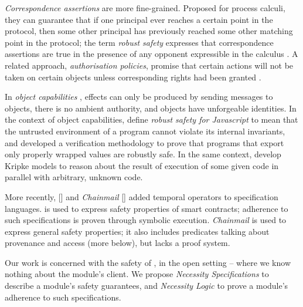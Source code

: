 \emph{Correspondence assertions} are more fine-grained. Proposed for 
process calculi, they can guarantee  that if one principal ever reaches a certain point in the protocol, then some other principal has previously reached some other matching point in the protocol; 
the term \emph{robust safety}  expresses that correspondence assertions are true in the presence of any opponent expressible in the calculus \cite{correspondence}. 
A related approach,  \emph{authorisation policies}, 
promise that certain actions will not be taken on certain objects
unless corresponding  rights had been granted  \cite{Maffeis:aiamb:thesis00}.

In   \emph{object capabilities} \cite{MillerPhD},
effects can only be produced by sending messages to objects,  there
is no ambient authority, and  objects 
have unforgeable identities.
In the context of object capabilities, \citeauthor{ddd} define  \emph{robust safety for Javascript}  
to mean that the untrusted environment of a program cannot violate 
its internal invariants, and developed  a verification methodology   to 
prove   that programs that  export only properly wrapped values  are robustly safe.
In the same context, \citeauthor{dd} develop Kripke models to reason about 
the result of execution of some given code in parallel
with arbitrary, unknown code.  
 
 More recently,  {} [\citeauthor{VerX}] and   \emph{Chainmail}  [\citeauthor{FASE}]
 added temporal operators to specification languages.
 {} is used to express safety properties of smart contracts;
 adherence to such specifications is proven through symbolic 
 execution.  \emph{Chainmail} is used to express general safety properties; it
 also includes predicates talking about provenance
 and access (more below), but lacks a proof system.
 
\vspace{.03in}
Our work is concerned with the safety of ,
in the open setting -- where we know nothing about the
module's client.
We propose \emph{Necessity Specifications} to describe a module's safety guarantees,
and \emph{Necessity Logic} to prove a module's adherence to such specifications.
%


